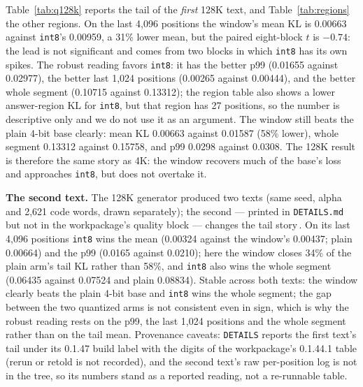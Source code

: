 \documentclass[10pt,twocolumn]{article}
\begin{document}
Table~\ref{tab:q128k} reports the tail of the \emph{first} 128K text, and Table~\ref{tab:regions} the other regions. On the last 4,096 positions the window's mean KL is 0.00663 against \texttt{int8}'s 0.00959, a 31\% lower mean, but the paired eight-block $t$ is $-0.74$: the lead is not significant and comes from two blocks in which \texttt{int8} has its own spikes. The robust reading favors \texttt{int8}: it has the better p99 (0.01655 against 0.02977), the better last 1,024 positions (0.00265 against 0.00444), and the better whole segment (0.10715 against 0.13312); the region table also shows a lower answer-region KL for \texttt{int8}, but that region has 27 positions, so the number is descriptive only and we do not use it as an argument. The window still beats the plain 4-bit base clearly: mean KL 0.00663 against 0.01587 (58\% lower), whole segment 0.13312 against 0.15758, and p99 0.0298 against 0.0308. The 128K result is therefore the same story as 4K: the window recovers much of the base's loss and approaches \texttt{int8}, but does not overtake it.

\textbf{The second text.} The 128K generator produced two texts (same seed, alpha and 2,621 code words, drawn separately); the second --- printed in \texttt{DETAILS.md} but not in the workpackage's quality block --- changes the tail story\,\cite{strata-details}. On its last 4,096 positions \texttt{int8} wins the mean (0.00324 against the window's 0.00437; plain 0.00664) and the p99 (0.0165 against 0.0210); here the window closes 34\% of the plain arm's tail KL rather than 58\%, and \texttt{int8} also wins the whole segment (0.06435 against 0.07524 and plain 0.08834). Stable across both texts: the window clearly beats the plain 4-bit base and \texttt{int8} wins the whole segment; the gap between the two quantized arms is not consistent even in sign, which is why the robust reading rests on the p99, the last 1,024 positions and the whole segment rather than on the tail mean. Provenance caveats: \texttt{DETAILS} reports the first text's tail under its 0.1.47 build label with the digits of the workpackage's 0.1.44.1 table (rerun or retold is not recorded), and the second text's raw per-position log is not in the tree, so its numbers stand as a reported reading, not a re-runnable table.
\end{document}
